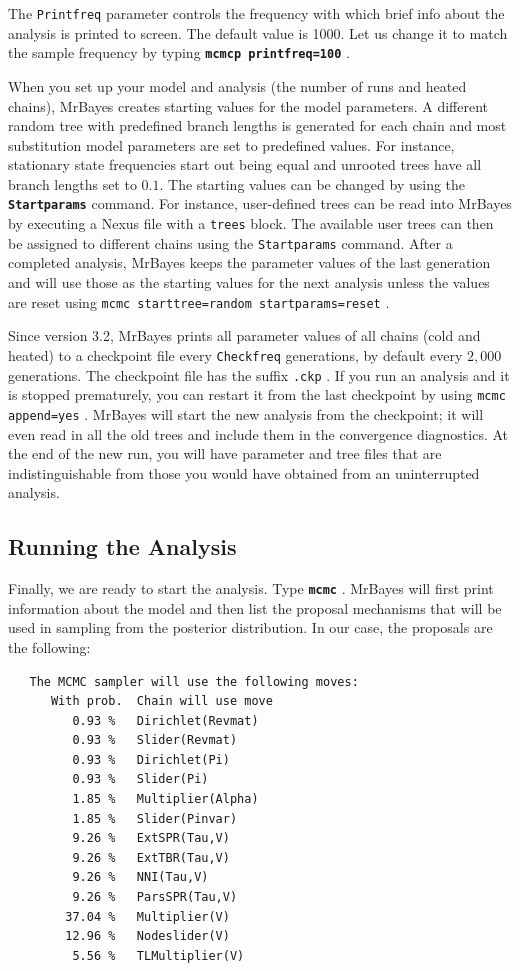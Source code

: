 \documentclass[12pt]{book}
\newcommand{\ttt}[1]{\texttt{#1} }
\newcommand{\tb}[1]{\ttt{\textbf{#1}} }
\begin{document}
The \ttt{Printfreq} parameter controls the frequency with which brief info about the analysis is
printed to screen. The default value is 1000. Let us change it to match the sample frequency by
typing \tb{mcmcp printfreq=100}.

When you set up your model and analysis (the number of runs and heated chains), MrBayes creates
starting values for the model parameters. A different random tree with predefined branch lengths is
generated for each chain and most substitution model parameters are set to predefined values. For
instance, stationary state frequencies start out being equal and unrooted trees have all branch
lengths set to $0.1$. The starting values can be changed by using the \tb{Startparams} command.
For instance, user-defined trees can be read into MrBayes by executing a Nexus file with a \ttt{trees}
block. The available user trees can then be assigned to different chains using the
\ttt{Startparams} command. After a completed analysis, MrBayes keeps the parameter values of the
last generation and will use those as the starting values for the next analysis unless the values
are reset using \ttt{mcmc starttree=random startparams=reset}.

Since version 3.2, MrBayes prints all parameter values of all chains (cold and heated) to a
checkpoint file every \ttt{Checkfreq} generations, by default every $2,000$ generations. The
checkpoint file has the suffix \ttt{.ckp}. If you run an analysis and it is stopped prematurely,
you can restart it from the last checkpoint by using \ttt{mcmc append=yes}. MrBayes will start
the new analysis from the checkpoint; it will even read in all the old trees and include them in
the convergence diagnostics. At the end of the new run, you will have parameter and tree files that
are indistinguishable from those you would have obtained from an uninterrupted analysis.

\subsection{Running the Analysis}

Finally, we are ready to start the analysis. Type \tb{mcmc}. MrBayes will first print
information about the model and then list the proposal mechanisms that will be used in sampling
from the posterior distribution. In our case, the proposals are the following:

\begin{singlespacing}
\small
\begin{verbatim}
   The MCMC sampler will use the following moves:
      With prob.  Chain will use move
         0.93 %   Dirichlet(Revmat)
         0.93 %   Slider(Revmat)
         0.93 %   Dirichlet(Pi)
         0.93 %   Slider(Pi)
         1.85 %   Multiplier(Alpha)
         1.85 %   Slider(Pinvar)
         9.26 %   ExtSPR(Tau,V)
         9.26 %   ExtTBR(Tau,V)
         9.26 %   NNI(Tau,V)
         9.26 %   ParsSPR(Tau,V)
        37.04 %   Multiplier(V)
        12.96 %   Nodeslider(V)
         5.56 %   TLMultiplier(V)
\end{verbatim}
\normalsize
\end{singlespacing}
\end{document}
